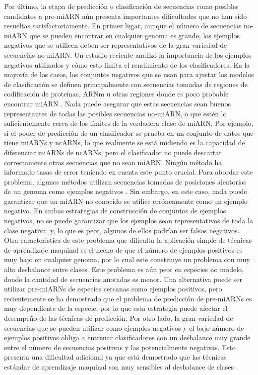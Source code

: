Por último, la etapa de predicción o clasificación de secuencias como posibles candidatos a pre-miARN aún presenta importantes dificultades que no han sido
resueltas satisfactoriamente. En primer lugar, aunque el número de secuencias no-miARN que se pueden encontrar en cualquier genoma es grande, los ejemplos
negativos que se utilicen deben ser representativos de la gran variedad de secuencias no-miARN. Un estudio reciente \citep{wei2014improved} analizó la importancia
de los ejemplos negativos utilizados y cómo esto limita el rendimiento de los clasificadores. En la mayoría de los casos, los conjuntos negativos que se usan
para ajustar los modelos de clasificación se definen principalmente con secuencias tomadas de regiones de codificación de proteínas, ARNm u otras regiones
donde es poco probable encontrar miARN \citep{peace2015framework, tempel2015mirboost}. Nada puede asegurar que estas secuencias sean buenos representantes de
todas las posibles secuencias no-miARN, o que estén lo suficientemente cerca de los límites de la verdadera clase de miARN. Por ejemplo, si el poder de
predicción de un clasificador se prueba en un conjunto de datos que tiene miARNs y ncARNs, lo que realmente se está midiendo es la capacidad de diferenciar
miARNs de ncARNs, pero el clasificador no puede descartar correctamente otras secuencias que no sean miARN. Ningún método ha informado tasas de error
teniendo en cuenta este punto crucial. Para abordar este problema, algunos métodos utilizan secuencias tomadas de posiciones aleatorias de un genoma como
ejemplos negativos \citep{wenyuan2013training, gudys2013huntmi}. Sin embargo, en este caso, nada puede garantizar que un miARN no conocido se utilice
erróneamente como un ejemplo negativo. En ambas estrategias de construcción de conjuntos de ejemplos negativos, no se puede garantizar que los ejemplos sean
representativos de toda la clase negativa; y, lo que es peor, algunos de ellos podrían ser falsos negativos. Otra característica de este problema que
dificulta la aplicación simple de técnicas de aprendizaje maquinal es el hecho de que el número de ejemplos positivos es muy bajo en cualquier genoma, por
lo cual este constituye un problema con muy alto desbalance entre clases. Este problema es aún peor en especies no modelo, donde la cantidad de secuencias
anotadas es menor. Una alternativa puede ser utilizar pre-miARNs de especies cercanas como ejemplos positivos, pero recientemente se ha demostrado
\citep{lopes2016automatic} que el problema de predicción de pre-miARNs es muy dependiente de la especie, por lo que esta estrategia puede afectar el desempeño de
las técnicas de predicción. Por otro lado, la gran variedad de secuencias que se pueden utilizar como ejemplos negativos y el bajo número de ejemplos
positivos obliga a entrenar clasificadores con un desbalance muy grande entre el número de secuencias positivas y las potencialmente negativas. Esto presenta
una dificultad adicional ya que está demostrado que las  técnicas estándar de aprendizaje maquinal son muy sensibles al desbalance de clases
\citep{guo2008class}.

